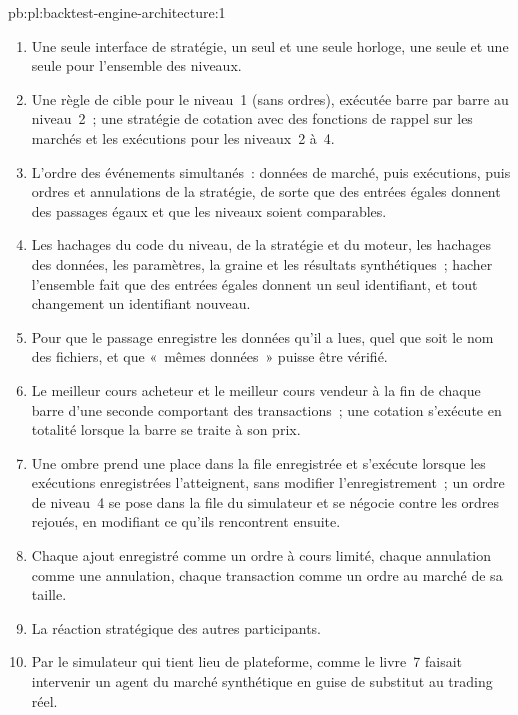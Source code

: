 \begin{solution}{pb:pl:backtest-engine-architecture:1}
\begin{enumerate}
\item Une seule interface de stratégie, un seul  et une seule horloge, une seule  et une seule  pour l'ensemble des niveaux.
\item Une règle de cible pour le niveau~1 (sans ordres), exécutée barre par barre au niveau~2~; une stratégie de cotation avec des fonctions de rappel sur les marchés et les exécutions pour les niveaux~2
à~4.
\item L'ordre des événements simultanés~: données de marché, puis exécutions, puis ordres et annulations de la stratégie, de sorte que des entrées égales donnent des passages égaux et que
les niveaux soient comparables.
\item Les hachages du code du niveau, de la stratégie et du moteur, les hachages des données, les paramètres, la graine et les résultats synthétiques~; hacher l'ensemble fait que des entrées égales donnent un seul
identifiant, et tout changement un identifiant nouveau.
\item Pour que le passage enregistre les données qu'il a lues, quel que soit le nom des fichiers, et que «~mêmes données~» puisse être vérifié.
\item Le meilleur cours acheteur et le meilleur cours vendeur à la fin de chaque barre d'une seconde comportant des transactions~; une cotation s'exécute en totalité lorsque la barre se traite à son prix.
\item Une ombre prend une place dans la file enregistrée et s'exécute lorsque les exécutions enregistrées l'atteignent, sans modifier l'enregistrement~; un ordre de niveau~4
se pose dans la file du simulateur et se négocie contre les ordres rejoués, en modifiant ce qu'ils rencontrent ensuite.
\item Chaque ajout enregistré comme un ordre à cours limité, chaque annulation comme une annulation, chaque transaction comme un ordre au marché de sa taille.
\item La réaction stratégique des autres participants.
\item Par le simulateur qui tient lieu de plateforme, comme le livre~7 faisait intervenir un agent du marché synthétique en guise de substitut au trading réel.

\end{enumerate}
\end{solution}

